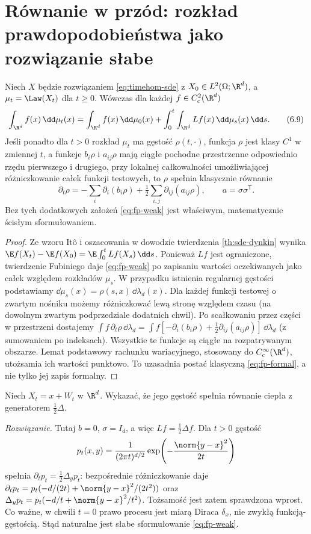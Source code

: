 \section{Równanie w przód: rozkład prawdopodobieństwa jako rozwiązanie słabe}
\begin{twierdzenie}
\label{th:sde-fp}
Niech $X$ będzie rozwiązaniem \eqref{eq:timehom-sde}
z $X_0\in L^2(\Omega;\R^d)$, a
$\mu_t=\Law(X_t)$ dla $t\ge0$. Wówczas dla każdej
$f\in C_c^2(\R^d)$
\[
\int_{\R^d}f(x)\,\dd\mu_t(x)
=\int_{\R^d}f(x)\,\dd\mu_0(x)
+\int_0^t\int_{\R^d}Lf(x)\,\dd\mu_s(x)\,\dd s.
\tag{6.9}\label{eq:fp-weak}
\]
Jeśli ponadto dla $t>0$ rozkład $\mu_t$ ma gęstość
$\rho(t,\cdot)$, funkcja $\rho$ jest klasy $C^1$
w zmiennej $t$, a funkcje $b_i\rho$ i $a_{ij}\rho$
mają ciągłe pochodne przestrzenne odpowiednio rzędu
pierwszego i drugiego, przy lokalnej całkowalności
umożliwiającej różniczkowanie całek funkcji testowych,
to $\rho$ spełnia klasycznie równanie
\[
\partial_t\rho
=-\sum_i\partial_i(b_i\rho)
+\tfrac12\sum_{i,j}\partial_{ij}(a_{ij}\rho),
\qquad a=\sigma\sigma^{\mathsf T}.
\tag{6.10}\label{eq:fp-formal}
\]
Bez tych dodatkowych założeń \eqref{eq:fp-weak}
jest właściwym, matematycznie ścisłym sformułowaniem.
\end{twierdzenie}
\begin{proof}
Ze wzoru Itô i oszacowania w dowodzie twierdzenia
\ref{th:sde-dynkin} wynika
$\E f(X_t)-\E f(X_0)=\E\int_0^t Lf(X_s)\,\dd s$.
Ponieważ $Lf$ jest ograniczone, twierdzenie Fubiniego
daje \eqref{eq:fp-weak} po zapisaniu wartości
oczekiwanych jako całek względem rozkładów $\mu_s$.
W przypadku istnienia regularnej gęstości podstawiamy
$\dd\mu_s(x)=\rho(s,x)\,\dd\lambda_d(x)$.
Dla każdej funkcji testowej o zwartym nośniku możemy
różniczkować lewą stronę względem czasu (na dowolnym
zwartym podprzedziale dodatnich chwil). Po scałkowaniu
przez części w przestrzeni dostajemy
$\int f\,\partial_t\rho\,\dd\lambda_d
=\int f[-\partial_i(b_i\rho)+\frac12\partial_{ij}(a_{ij}\rho)]
\,\dd\lambda_d$ (z sumowaniem po indeksach).
Wszystkie te funkcje są ciągłe na rozpatrywanym obszarze.
Lemat podstawowy rachunku wariacyjnego, stosowany do
$C_c^\infty(\R^d)$, utożsamia ich wartości punktowo.
To uzasadnia postać klasyczną \eqref{eq:fp-formal},
a nie tylko jej zapis formalny.
\end{proof}

\begin{zadanie}
Niech $X_t=x+W_t$ w $\R^d$. Wykazać, że jego gęstość
spełnia równanie ciepła z generatorem $\tfrac12\Delta$.

\emph{Rozwiązanie.} Tutaj $b=0$, $\sigma=I_d$,
a więc $Lf=\tfrac12\Delta f$. Dla $t>0$ gęstość
\[
p_t(x,y)=\frac1{(2\pi t)^{d/2}}
\exp\!\left(-\frac{\norm{y-x}^2}{2t}\right)
\]
spełnia $\partial_t p_t=\frac12\Delta_y p_t$:
bezpośrednie różniczkowanie daje
$\partial_t p_t=p_t(-d/(2t)+\norm{y-x}^2/(2t^2))$
oraz
$\Delta_y p_t=p_t(-d/t+\norm{y-x}^2/t^2)$.
Tożsamość jest zatem sprawdzona wprost.
Co ważne, w chwili $t=0$ prawo procesu jest miarą
Diraca $\delta_x$, nie zwykłą funkcją-gęstością.
Stąd naturalne jest słabe sformułowanie
\eqref{eq:fp-weak}.
\end{zadanie}

